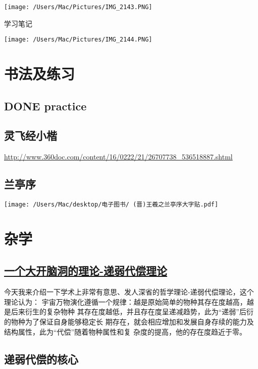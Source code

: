 \documentclass[11pt]{ctexart}
\begin{document}
{{{{\begin{center}
\texttt{[image: /Users/Mac/Pictures/IMG\_2143.PNG]}
\end{center}

学习笔记

\begin{center}
\texttt{[image: /Users/Mac/Pictures/IMG\_2144.PNG]}
\end{center}
\section{书法及练习}
\label{sec:orgfeddffd}
\subsection{{\bfseries\sffamily DONE} practice}
\label{sec:org94b34d5}
\subsection{灵飞经小楷}
\label{sec:org58596c3}
\url{http://www.360doc.com/content/16/0222/21/26707738\_536518887.shtml}
\subsection{兰亭序}
\label{sec:orgafdcc07}
\begin{center}
\texttt{[image: /Users/Mac/desktop/电子图书/ (晋)王羲之兰亭序大字贴.pdf]}
\end{center}
\section{杂学}
\label{sec:org1da6287}
\subsection{\href{http://baijiahao.baidu.com/s?id=1582633309001573756\&wfr=spider\&for=pc}{一个大开脑洞的理论-递弱代偿理论}}
\label{sec:org338faa8}
今天我来介绍一下学术上非常有意思、发人深省的哲学理论-递弱代偿理论，这个理论认为：
宇宙万物演化遵循一个规律：越是原始简单的物种其存在度越高，越是后来衍生的复杂物种
其存在度越低，并且存在度呈递减趋势，此为“递弱”后衍的物种为了保证自身能够稳定长
期存在，就会相应增加和发展自身存续的能力及结构属性，此为“代偿”随着物种属性和复
杂度的提高，他的存在度趋近于零。

\subsection{递弱代偿的核心}
\label{sec:org18725cd}

}}}}
\end{document}
